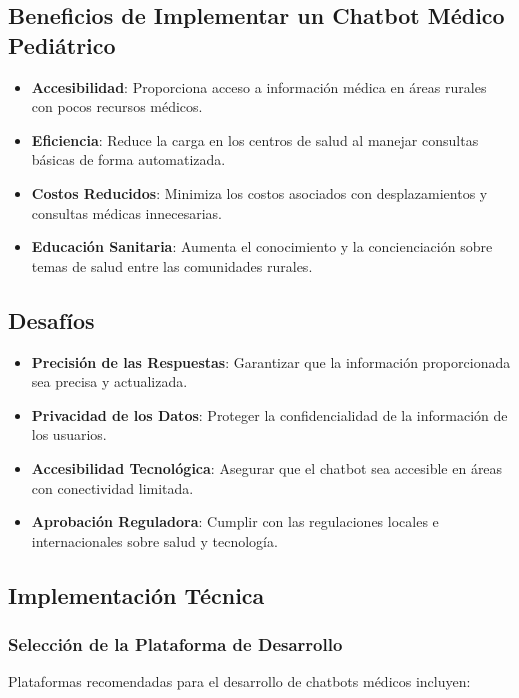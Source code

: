 \subsection{Beneficios de Implementar un Chatbot Médico Pediátrico}

\begin{itemize}
    \item \textbf{Accesibilidad}: Proporciona acceso a información médica en áreas rurales con pocos recursos médicos.
    \item \textbf{Eficiencia}: Reduce la carga en los centros de salud al manejar consultas básicas de forma automatizada.
    \item \textbf{Costos Reducidos}: Minimiza los costos asociados con desplazamientos y consultas médicas innecesarias.
    \item \textbf{Educación Sanitaria}: Aumenta el conocimiento y la concienciación sobre temas de salud entre las comunidades rurales.
\end{itemize}

\subsection{Desafíos}

\begin{itemize}
    \item \textbf{Precisión de las Respuestas}: Garantizar que la información proporcionada sea precisa y actualizada.
    \item \textbf{Privacidad de los Datos}: Proteger la confidencialidad de la información de los usuarios.
    \item \textbf{Accesibilidad Tecnológica}: Asegurar que el chatbot sea accesible en áreas con conectividad limitada.
    \item \textbf{Aprobación Reguladora}: Cumplir con las regulaciones locales e internacionales sobre salud y tecnología.
\end{itemize}

\subsection{Implementación Técnica}

\subsubsection{Selección de la Plataforma de Desarrollo}

Plataformas recomendadas para el desarrollo de chatbots médicos incluyen:

